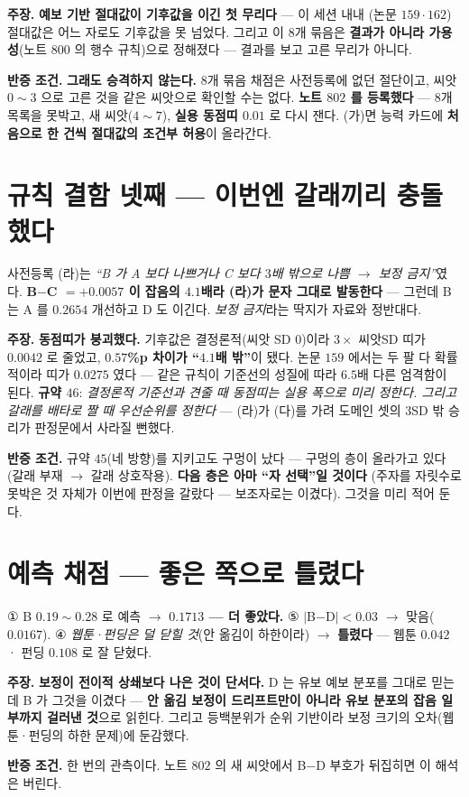 \documentclass[10pt,a4paper]{article}
\newcommand{\claim}[2]{\begin{claimbox}\textbf{주장.} #1\par\smallskip
  \textcolor{gray!70}{\textbf{반증 조건.} #2}\end{claimbox}}
\begin{document}
\claim{\textbf{예보 기반 절대값이 기후값을 이긴 첫 무리다} --- 이 세션 내내
(논문 $159 \cdot 162$) 절대값은 어느 자로도 기후값을 못 넘었다. 그리고 이 $8$개
묶음은 \textbf{결과가 아니라 가용성}(노트 $800$ 의 행수 규칙)으로 정해졌다 ---
결과를 보고 고른 무리가 아니다.}
{\textbf{그래도 승격하지 않는다.} $8$개 묶음 채점은 사전등록에 없던 절단이고,
씨앗 $0{\sim}3$ 으로 고른 것을 같은 씨앗으로 확인할 수는 없다. \textbf{노트
$802$ 를 등록했다} --- $8$개 목록을 못박고, 새 씨앗($4{\sim}7$), \textbf{실용
동점띠 $0.01$} 로 다시 잰다. (가)면 능력 카드에 \textbf{처음으로 한 건씩
절대값의 조건부 허용}이 올라간다.}

\section{규칙 결함 넷째 --- 이번엔 갈래끼리 충돌했다}

사전등록 (라)는 \emph{``B 가 A 보다 나쁘거나 C 보다 $3$배 밖으로 나쁨 $\to$ 보정
금지''}였다. \textbf{B$-$C $= +0.0057$ 이 잡음의 $4.1$배라 (라)가 문자 그대로
발동한다} --- 그런데 B 는 A 를 $0.2654$ 개선하고 D 도 이긴다. \emph{보정 금지}라는
딱지가 자료와 정반대다.

\claim{\textbf{동점띠가 붕괴했다.} 기후값은 결정론적(씨앗 SD $0$)이라 $3\times$
씨앗SD 띠가 $0.0042$ 로 줄었고, \textbf{$0.57$\%p 차이가 ``$4.1$배 밖''}이 됐다.
논문 $159$ 에서는 두 팔 다 확률적이라 띠가 $0.0275$ 였다 --- 같은 규칙이 기준선의
성질에 따라 $6.5$배 다른 엄격함이 된다. \textbf{규약 $46$}: \emph{결정론적
기준선과 견줄 때 동점띠는 실용 폭으로 미리 정한다. 그리고 갈래를 배타로 짤 때
우선순위를 정한다} --- (라)가 (다)를 가려 도메인 셋의 $3$SD 밖 승리가 판정문에서
사라질 뻔했다.}
{규약 $45$(네 방향)를 지키고도 구멍이 났다 --- 구멍의 층이 올라가고 있다
(갈래 부재 $\to$ 갈래 상호작용). \textbf{다음 층은 아마 ``자 선택''일 것이다}
(주자를 자릿수로 못박은 것 자체가 이번에 판정을 갈랐다 --- 보조자로는 이겼다).
그것을 미리 적어 둔다.}

\section{예측 채점 --- 좋은 쪽으로 틀렸다}

① B $0.19{\sim}0.28$ 로 예측 $\to$ \textbf{$0.1713$ --- 더 좋았다.} ⑤ $|$B$-$D$|
< 0.03$ $\to$ 맞음($0.0167$). ④ \emph{웹툰·펀딩은 덜 닫힐 것}(안 옮김이 하한이라)
$\to$ \textbf{틀렸다} --- 웹툰 $0.042$ · 펀딩 $0.108$ 로 잘 닫혔다.

\claim{\textbf{보정이 전이적 상쇄보다 나은 것이 단서다.} D 는 유보 예보 분포를
그대로 믿는데 B 가 그것을 이겼다 --- \textbf{안 옮김 보정이 드리프트만이 아니라
유보 분포의 잡음 일부까지 걸러낸 것}으로 읽힌다. 그리고 등백분위가 순위 기반이라
보정 크기의 오차(웹툰·펀딩의 하한 문제)에 둔감했다.}
{한 번의 관측이다. 노트 $802$ 의 새 씨앗에서 B$-$D 부호가 뒤집히면 이 해석은
버린다.}
\end{document}
